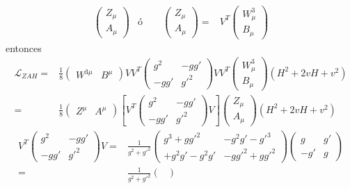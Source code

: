 \begin{frame}
\begin{align}
\begin{pmatrix}
    Z_\mu\\
    A_\mu
  \end{pmatrix}&\text{ó}\qquad
  \begin{pmatrix}
    Z_\mu\\
    A_\mu
  \end{pmatrix}=&V^T
  \begin{pmatrix}
    W^3_\mu\\
    B_\mu
  \end{pmatrix}
\end{align}
entonces
\begin{align}
  \mathcal{L}_{ZAH}=&\frac{1}{8}
  \begin{pmatrix}
    W^{3\mu} & B^\mu
  \end{pmatrix}VV^T
  \begin{pmatrix}
    g^2&-gg'\\
    -gg'&{g'}^2
  \end{pmatrix}VV^T
  \begin{pmatrix}
    W^3_\mu\\
    B_\mu
  \end{pmatrix}
\left(H^2+2vH+v^2\right)\nonumber\\
=&\frac{1}{8}
  \begin{pmatrix}
    Z^\mu & A^\mu
  \end{pmatrix}\left[V^T
  \begin{pmatrix}
    g^2&-gg'\\
    -gg'&{g'}^2
  \end{pmatrix}V\right]
  \begin{pmatrix}
    Z_\mu\\
    A_\mu
  \end{pmatrix}
\left(H^2+2vH+v^2\right)
\end{align}
\begin{align}
  V^T
  \begin{pmatrix}
    g^2&-gg'\\
    -gg'&{g'}^2
  \end{pmatrix}V=&\frac{1}{g^2+{g'}^2}
  \begin{pmatrix}
    g^3+g{g'}^2 & -g^2g'-{g'}^3\\
+g^2g'-g^2g'    &-g{g'}^2+g{g'}^2
  \end{pmatrix}
\begin{pmatrix}
    g   & g'\\
    -g' & g
  \end{pmatrix}\nonumber\\
=&\frac{1}{g^2+{g'}^2}
  \begin{pmatrix}

\end{pmatrix}
\end{align}
\end{frame}
